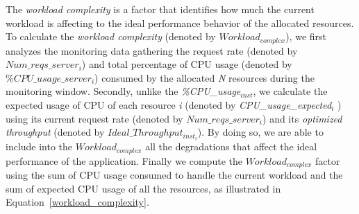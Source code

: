

The \emph{workload complexity} is a factor that identifies how much the current workload is affecting to the ideal performance behavior of the allocated resources. To calculate the \emph{workload complexity} (denoted by \emph{$Workload_{complex}$}), we first analyzes the monitoring data gathering the request rate (denoted by $Num\_reqs\_server_{i}$) and total percentage of CPU usage (denoted by \emph{$\%CPU\_usage\_server_{i}$}) consumed by the allocated \emph{N} resources during the monitoring window. Secondly, unlike the \emph{\%CPU\_usage$_{inst}$},  we calculate the expected usage of CPU of each resource \emph{i} (denoted by \emph{CPU\_usage\_expected$_{i}$} ) using its current request rate (denoted by $Num\_reqs\_server_{i}$) and its \emph{optimized throughput} (denoted by $Ideal\_Throughput_{inst_{i}}$). By doing so, we are able to include into the \emph{$Workload_{complex}$} all the degradations that affect the ideal performance of the application. Finally we compute the \emph{$Workload_{complex}$} factor using the sum of CPU usage consumed to handle the current workload and the sum of expected CPU usage of all the resources, as illustrated in Equation~\ref{workload_complexity}.



